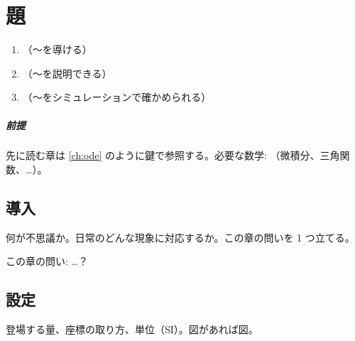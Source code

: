 \chapter{題}\label{ch:名前}

\begin{objectives}
\begin{enumerate}
  \item （〜を導ける）
  \item （〜を説明できる）
  \item （〜をシミュレーションで確かめられる）
\end{enumerate}
\end{objectives}

\paragraph{前提}
先に読む章は \ref{ch:ode} のように鍵で参照する。必要な数学: （微積分、三角関数、…）。

\section{導入}\label{sec:名前-intro}

何が不思議か。日常のどんな現象に対応するか。この章の問いを 1 つ立てる。

\begin{intuition}
この章の問い: …？
\end{intuition}

\section{設定}\label{sec:名前-setup}

登場する量、座標の取り方、単位（SI）。図があれば図。


